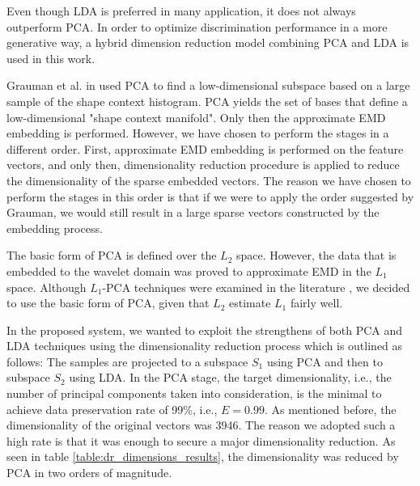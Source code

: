 \iftoggle{edit-mode}{\hspace{0pt}\marginpar{Why do we use both LDA and PCA?}}{}
Even though LDA is preferred in many application, it does not always outperform PCA. In order to optimize discrimination performance in a more generative way, a hybrid dimension reduction model combining PCA and LDA is used in this work.

\iftoggle{edit-mode}{\hspace{0pt}\marginpar{When to perform the DR?}}{}
Grauman et al. in \cite{grauman2004fast} used PCA to find a low-dimensional subspace based on a large sample of the shape context histogram. PCA yields the set of bases that define a low-dimensional "shape context manifold". Only then the approximate EMD embedding is performed. However, we have chosen to perform the stages in a different order. First, approximate EMD embedding is performed on the feature vectors, and only then, dimensionality reduction procedure is applied to reduce the dimensionality of the sparse embedded vectors. The reason we have chosen to perform the stages in this order is that if we were to apply the order suggested by Grauman, we would still result in a large sparse vectors constructed by the embedding process.
  
\iftoggle{edit-mode}{\hspace{0pt}\marginpar{Usage of PCA in the $L_1$ space.}}{}
The basic form of PCA is defined over the $L_2$ space. However, the data that is embedded to the wavelet domain was proved to approximate EMD in the $L_1$ space. Although $L_1$-PCA techniques were examined in the literature \cite{kwak2008principal}, we decided to use the basic form of PCA, given that $L_2$ estimate $L_1$ fairly well.

\iftoggle{edit-mode}{\hspace{0pt}\marginpar{Implementation: PCA}}{}
In the proposed system, we wanted to exploit the strengthens of both PCA and LDA techniques using the dimensionality reduction process which is outlined as follows: The samples are projected to a subspace $S_1$ using PCA and then to subspace $S_2$ using LDA. In the PCA stage, the target dimensionality, i.e., the number of principal components taken into consideration, is the minimal to achieve data preservation rate of 99\%, i.e., $E=0.99$. As mentioned before, the dimensionality of the original vectors was 3946. The reason we adopted such a high rate is that it was enough to secure a major dimensionality reduction. As seen in table \ref{table:dr_dimensions_results}, the dimensionality was reduced by PCA in two orders of magnitude.

